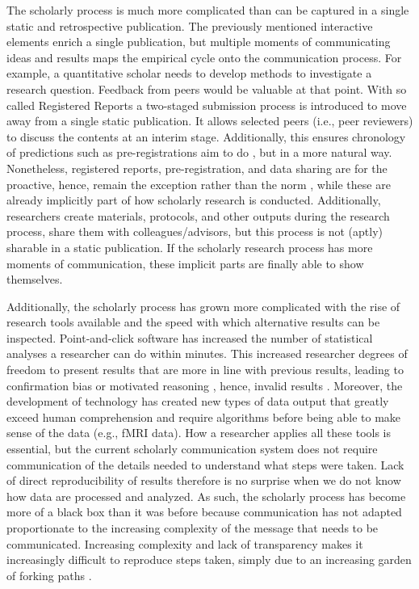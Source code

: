 \documentclass[]{tufte-book}
\begin{document}
The scholarly process is much more complicated than can be captured in a
single static and retrospective publication. The previously mentioned
interactive elements enrich a single publication, but multiple moments
of communicating ideas and results maps the empirical cycle onto the
communication process. For example, a quantitative scholar needs to
develop methods to investigate a research question. Feedback from peers
would be valuable at that point. With so called Registered Reports
\citep{10.1016/j.cortex.2012.12.016} a two-staged submission process is
introduced to move away from a single static publication. It allows
selected peers (i.e., peer reviewers) to discuss the contents at an
interim stage. Additionally, this ensures chronology of predictions such
as pre-registrations aim to do \citep{10.1038/s41562-016-0021}, but in a
more natural way. Nonetheless, registered reports, pre-registration, and
data sharing are for the proactive, hence, remain the exception rather
than the norm \citep{10.1371/journal.pbio.1002456}, while these are
already implicitly part of how scholarly research is conducted.
Additionally, researchers create materials, protocols, and other outputs
during the research process, share them with colleagues/advisors, but
this process is not (aptly) sharable in a static publication. If the
scholarly research process has more moments of communication, these
implicit parts are finally able to show themselves.

Additionally, the scholarly process has grown more complicated with the
rise of research tools available and the speed with which alternative
results can be inspected. Point-and-click software has increased the
number of statistical analyses a researcher can do within minutes. This
increased researcher degrees of freedom to present results that are more
in line with previous results, leading to confirmation bias or motivated
reasoning \citep{10.1037/0033-2909.108.3.480}, hence, invalid results
\citep{10.1177/0956797611417632}. Moreover, the development of
technology has created new types of data output that greatly exceed
human comprehension and require algorithms before being able to make
sense of the data (e.g., fMRI data). How a researcher applies all these
tools is essential, but the current scholarly communication system does
not require communication of the details needed to understand what steps
were taken. Lack of direct reproducibility of results
\citep[e.g.,][]{10.1101/056473} therefore is no surprise when we do not
know how data are processed and analyzed. As such, the scholarly process
has become more of a black box than it was before because communication
has not adapted proportionate to the increasing complexity of the
message that needs to be communicated. Increasing complexity and lack of
transparency makes it increasingly difficult to reproduce steps taken,
simply due to an increasing garden of forking paths
\citep{10.1511/2014.111.460}.
\end{document}

